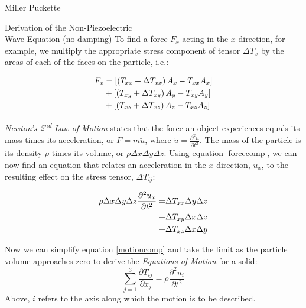 \documentclass[a4paper,10pt]{report}
\numberwithin{equation}{section}
\begin{document}
\begin{chapter}{Miller Puckette}
\begin{section}{Derivation of the Non-Piezoelectric \\ Wave Equation (no damping)}
To find a force $F_x$ acting in the $x$ direction, for example, we multiply the appropriate stress component of tensor $\Delta T_x$ by the areas of each of the faces on the particle, i.e.\cite[p.~15]{Ballantine1997}:
\begin{singlespace}
\begin{align}\label{forcecomp}
F_x &= \left[ \left( T_{xx} + \Delta T_{xx} \right) A_x - T_{xx} A_x \right]
\notag \\
&+ \left[ \left( T_{xy} + \Delta T_{xy} \right) A_y - T_{xy} A_y \right]  \\
&+ \left[ \left( T_{xz} + \Delta T_{xz} \right) A_z - T_{xz} A_z \right] \notag
\end{align}
\end{singlespace}
\emph{Newton's 2\textsuperscript{nd} Law of Motion} states that the force an object experiences equals its
mass times its acceleration, or $F = m \ddot{u}$, where $\ddot{u}
= \frac{\partial^2u}{\partial t^2}$. The mass of the particle is its density
$\rho$ times its volume, or $\rho \Delta x \Delta y \Delta z$. 
Using equation \eqref{forcecomp}, we can now find an equation that relates an
acceleration in the $x$ direction, $\ddot{u}_x$, to the 
resulting effect on the stress tensor, $\Delta T_{ij}$\cite[p.~16]{Ballantine1997}:
\begin{singlespace}
\begin{align}\label{motioncomp}
\rho \Delta x \Delta y \Delta z \frac{\partial^2u_x}{\partial t^2} = &\Delta
T_{xx} \Delta y \Delta z \notag \\
+ &\Delta T_{xy} \Delta x \Delta z  \\
+ &\Delta T_{xz} \Delta x \Delta y \notag
\end{align}
\end{singlespace}
Now we can simplify equation \eqref{motioncomp} and take the limit as the
particle volume approaches zero to derive the \emph{Equations of Motion} for a
solid:
\begin{equation}\label{motion}
 \sum_{j=1}^{3} \frac{\partial T_{ij}}{\partial x_j} = \rho \frac{\partial ^2
u_i}{\partial t^2}
\end{equation}
Above, $i$ refers to the axis along which the motion is to be described.\cite[p.~16]{Ballantine1997} \cite[p.~4]{Kino1987}


\end{section}
\end{chapter}
\end{document}
